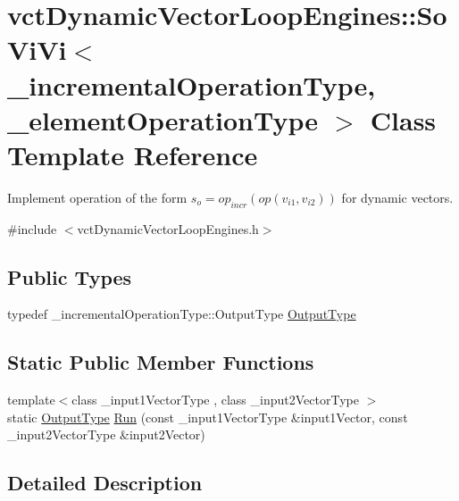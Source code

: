 \hypertarget{classvct_dynamic_vector_loop_engines_1_1_so_vi_vi}{}\section{vct\+Dynamic\+Vector\+Loop\+Engines\+:\+:So\+Vi\+Vi$<$ \+\_\+incremental\+Operation\+Type, \+\_\+element\+Operation\+Type $>$ Class Template Reference}
\label{classvct_dynamic_vector_loop_engines_1_1_so_vi_vi}


Implement operation of the form $s_o = op_{incr}(op(v_{i1}, v_{i2}))$ for dynamic vectors.  




{\ttfamily \#include $<$vct\+Dynamic\+Vector\+Loop\+Engines.\+h$>$}

\subsection*{Public Types}
\begin{DoxyCompactItemize}
\item 
typedef \+\_\+incremental\+Operation\+Type\+::\+Output\+Type \hyperlink{classvct_dynamic_vector_loop_engines_1_1_so_vi_vi_af495d5a3b96441aefe55b21a9988d335}{Output\+Type}
\end{DoxyCompactItemize}
\subsection*{Static Public Member Functions}
\begin{DoxyCompactItemize}
\item 
{\footnotesize template$<$class \+\_\+input1\+Vector\+Type , class \+\_\+input2\+Vector\+Type $>$ }\\static \hyperlink{classvct_dynamic_vector_loop_engines_1_1_so_vi_vi_af495d5a3b96441aefe55b21a9988d335}{Output\+Type} \hyperlink{classvct_dynamic_vector_loop_engines_1_1_so_vi_vi_a541dc81fac40742aa4fff8f124c4c43e}{Run} (const \+\_\+input1\+Vector\+Type \&input1\+Vector, const \+\_\+input2\+Vector\+Type \&input2\+Vector)
\end{DoxyCompactItemize}


\subsection{Detailed Description}
